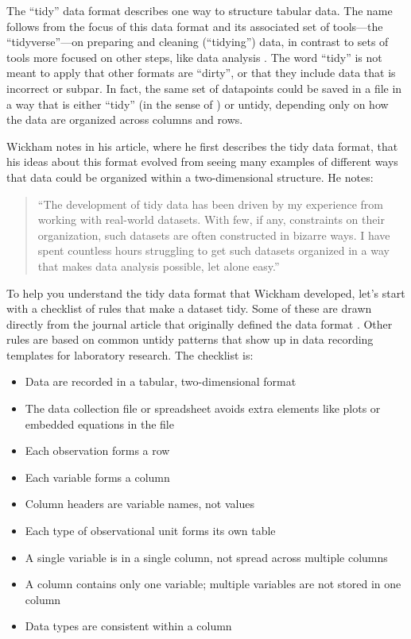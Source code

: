 \documentclass[]{tufte-book}
\providecommand{\tightlist}{%
  \setlength{\itemsep}{0pt}\setlength{\parskip}{0pt}}
\begin{document}
The ``tidy'' data format describes one way to structure tabular data. The name
follows from the focus of this data format and its associated set of tools---the
``tidyverse''---on preparing and cleaning (``tidying'') data, in contrast to sets of
tools more focused on other steps, like data analysis \citep{wickham2014tidy}. The
word ``tidy'' is not meant to apply that other formats are ``dirty'', or that they
include data that is incorrect or subpar. In fact, the same set of datapoints
could be saved in a file in a way that is either ``tidy'' (in the sense of
\citep{wickham2014tidy}) or untidy, depending only on how the data are organized
across columns and rows.

Wickham notes in his article, where he first describes the tidy data format,
that his ideas about this format evolved from seeing many examples of
different ways that data could be organized within a two-dimensional structure.
He notes:

\begin{quote}
``The development of tidy data has been driven by my experience from working
with real-world datasets. With few, if any, constraints on their organization,
such datasets are often constructed in bizarre ways. I have spent countless
hours struggling to get such datasets organized in a way that makes data
analysis possible, let alone easy.'' \citep{wickham2014tidy}
\end{quote}

To help you understand the tidy data format that Wickham developed, let's start
with a checklist of rules that make a dataset tidy. Some of these are drawn
directly from the journal article that originally defined the data format
\citep{wickham2014tidy}. Other rules are based on common untidy patterns that show
up in data recording templates for laboratory research. The checklist is:

\begin{itemize}
\tightlist
\item
  Data are recorded in a tabular, two-dimensional format
\item
  The data collection file or spreadsheet avoids extra elements
  like plots or embedded equations in the file
\item
  Each observation forms a row
\item
  Each variable forms a column
\item
  Column headers are variable names, not values
\item
  Each type of observational unit forms its own table
\item
  A single variable is in a single column, not spread across multiple columns
\item
  A column contains only one variable; multiple variables are not stored in one column
\item
  Data types are consistent within a column
\end{itemize}
\end{document}
